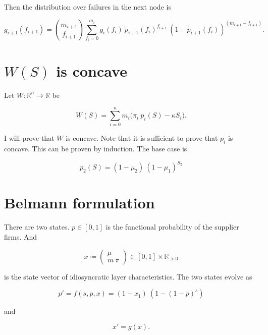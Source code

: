 \documentclass[american, abstract=on]{scrartcl}
\renewcommand{\Re}{\mathbb{R}}
\begin{document}
Then the distribution over failures in the next node is

\begin{equation}
  g_{i+1}(f_{i+1}) = \binom{m_{i+1}}{f_{i+1}} \sum^{m_i}_{f_i = 0} g_i(f_i) \ \tilde{p}_{i+1}(f_i)^{f_{i+1}} \ (1 - \tilde{p}_{i+1}(f_i))^{(m_{i+1} - f_{i + 1})}.
\end{equation}

\newpage
\nocite{*}
\printbibliography

\newpage
\appendix
\section[Concavity of social planner problem]{$W(S)$ is concave}

Let $W: \Re^n \to \Re$ be

\begin{equation}
  W(S) = \sum^n_{i = 0} m_i \Big( \pi_i \ p_i(S) - \kappa S_i \Big).
\end{equation}

I will prove that $W$ is concave. Note that it is sufficient to prove that $p_i$ is concave. This can be proven by induction. The base case is 

\begin{equation}
  p_2(S) = (1 - \mu_2) \ (1 - \mu_1)^{S_2}
\end{equation}

\section{Belmann formulation}

There are two states. $p \in [0, 1]$ is the functional probability of the supplier firms. And 

\begin{equation}
  x \coloneqq \begin{pmatrix}
    \mu \\ m \ \pi
  \end{pmatrix} \in [0, 1] \times \Re_{>0}
\end{equation}

is the state vector of idiosyncratic layer characteristics. The two states evolve as

\begin{equation}
  p' = f(s, p, x) = (1 - x_1) \ (1 - (1 - p)^s)
\end{equation}

and

\begin{equation}
  x' = g(x).
\end{equation}
\end{document}
